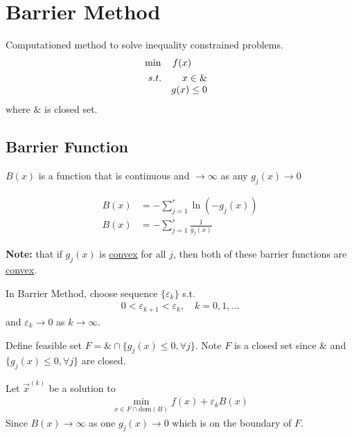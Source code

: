 \documentclass[11pt]{elegantbook}
\begin{document}
\section{Barrier Method}
Computationed method to solve inequality constrained problems.
\begin{align*}
    &\min\quad f(x)\\
    &\begin{array}{r@{\quad}r@{}l@{\quad}l}
    s.t.
    &x\in\&&\\
    &g(x)\leq 0&\\
\end{array}
\end{align*}
where $\&$ is closed set.
\subsection*{Barrier Function}
$B(x)$ is a function that is continuous and $\rightarrow \infty$ as any $g_j(x) \rightarrow	0$
\begin{example}

    \begin{equation}
        \begin{aligned}
            B(x)&=-\sum_{j=1}^r\ln(-g_j(x))\\
            B(x)&=-\sum_{j=1}^r\frac{1}{g_j(x)}
        \end{aligned}
        \nonumber
    \end{equation}

\end{example}
\textbf{Note:} that if $g_j(x)$ is \underline{convex} for all $j$, then both of these barrier functions are \underline{convex}.

In Barrier Method, choose sequence $\{\varepsilon_k\}$ s.t.
\begin{equation}
    \begin{aligned}
        0<\varepsilon_{k+1}<\varepsilon_k,\quad k=0,1,...
    \end{aligned}
    \nonumber
\end{equation}
and $\varepsilon_k \rightarrow 0$ as $k \rightarrow	\infty$.

Define feasible set $F=\&\cap\{g_j(x)\leq 0,\forall j\}$. Note $F$ is a closed set since $\&$ and $\{g_j(x)\leq 0,\forall j\}$ are closed.

Let $\vec{x}^{(k)}$ be a solution to
\begin{equation}
    \begin{aligned}
        \min_{x\in F\cap \text{dom}(B)}f(x)+\varepsilon_k B(x)
    \end{aligned}
    \nonumber
\end{equation}
Since $B(x) \rightarrow	\infty$ as one $g_j(x) \rightarrow	0$ which is on the boundary of $F$.
\end{document}
